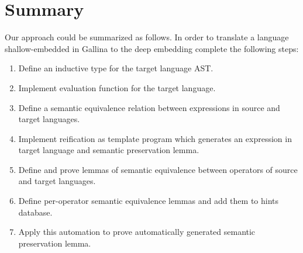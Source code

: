 \documentclass[sigplan]{acmart}\settopmatter{printfolios=true,printccs=false,printacmref=false}
\begin{document}
\section{Summary}

Our approach could be summarized as follows. In order to translate a
language shallow-embedded in Gallina to the deep embedding complete
the following steps:

\begin{enumerate}
\item Define an inductive type for the target language AST.
\item Implement evaluation function for the target language.
\item Define a semantic equivalence relation between expressions in
  source and target languages.
\item Implement reification as template program which generates an
  expression in target language and semantic preservation lemma.
\item Define and prove lemmas of semantic equivalence between
  operators of source and target languages.
\item Define per-operator semantic equivalence lemmas and add them to
  hints database.
\item Apply this automation to prove automatically generated semantic
  preservation lemma.  
\end{enumerate}



\nocite{*}

\end{document}
